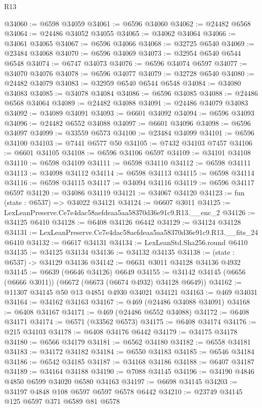 \begin{lexlean}{R13}
\begin{coremodule}
@34060 := @6598 @34059
@34061 := @6596 @34060
@34062 := @24482 @6568
@34064 := @24486 @34052 @34055
@34065 := @34062 @34064
@34066 := @34061 @34065
@34067 := @6596 @34066
@34068 := @32725 @6540
@34069 := @23484 @34068
@34070 := @6596 @34069
@34073 := @32954 @6540 @6544 @6548
@34074 := @6747 @34073
@34076 := @6596 @34074 @6597
@34077 := @34070 @34076
@34078 := @6596 @34077
@34079 := @32728 @6540
@34080 := @24482 @34079
@34083 := @32959 @6540 @6544 @6548
@34084 := @34080 @34083
@34085 := @34078 @34084
@34086 := @6596 @34085
@34088 := @24486 @6568 @34064
@34089 := @24482 @34088
@34091 := @24486 @34079 @34083
@34092 := @34089 @34091
@34093 := @6601 @34092
@34094 := @6596 @34093
@34096 := @24482 @6552 @34088
@34097 := @6601 @34096
@34098 := @6596 @34097
@34099 := @33559 @6573
@34100 := @23484 @34099
@34101 := @6596 @34100
@34103 := @7441 @6577 @50
@34105 := @7432 @34103 @7457
@34106 := @6601 @34105
@34108 := @6596 @34106 @6597
@34109 := @34101 @34108
@34110 := @6598 @34109
@34111 := @6598 @34110
@34112 := @6598 @34111
@34113 := @34098 @34112
@34114 := @6598 @34113
@34115 := @6598 @34114
@34116 := @6598 @34115
@34117 := @34094 @34116
@34119 := @6596 @34117 @6597
@34120 := @34086 @34119
@34121 := @34067 @34120
@34123 := fun (state : @6537) => @34022 @34121
@34124 := @6607 @3011
@34125 := LexLeanPreserve.Ce7e4dac58aefdeaa5aa58370d36e91c9.R13.__enc_2
@34126 := @34125 @6410
@34128 := @6408 @34126 @6442
@34129 := @34124 @34128
@34131 := LexLeanPreserve.Ce7e4dac58aefdeaa5aa58370d36e91c9.R13.__fits_24 @6410
@34132 := @6617 @34131
@34134 := LexLeanStd.Sha256.round @6410
@34135 := @34125 @34134
@34136 := @34132 @34135
@34138 := (state : @6537) -> @34129 @34136
@34142 := @6631 @3011 @34128 @34136 @4932
@34145 := @6639 (@6646 @34126) @6649
@34155 := @34142 @34145 (@6656 (@6666 @3011)) (@6672 (@6673 (@6674 @4932) @34128 @6649))
@34162 := @11307 @34145 @50 @13 @4851 @4930 @34021 @34121
@34163 := @469 @34031
@34164 := @34162 @34163
@34167 := @469 (@24486 @34088 @34091)
@34168 := @6408 @34167
@34171 := @469 (@24486 @6552 @34088)
@34172 := @6408 @34171
@34174 := @6571 (@33562 @6573)
@34175 := @6408 @34174
@34176 := @215 @34103
@34178 := @6408 @34176 @6442
@34179 := @34175 @34178
@34180 := @6566 @34179
@34181 := @6562 @34180
@34182 := @6558 @34181
@34183 := @34172 @34182
@34184 := @6550 @34183
@34185 := @6546 @34184
@34186 := @6542 @34185
@34187 := @34168 @34186
@34188 := @6407 @34187
@34189 := @34164 @34188
@34190 := @7088 @34145
@34196 := @34190 @4846 @4850 @6599 @34020 @6580 @34163
@34197 := @6698 @34145
@34203 := @34197 @4848 @108 @6597 @6597 @6578 @6442
@34210 := @23749 @34145 @125 @6597 @371 @6589 @81 @6578

\end{coremodule}
\end{lexlean}
